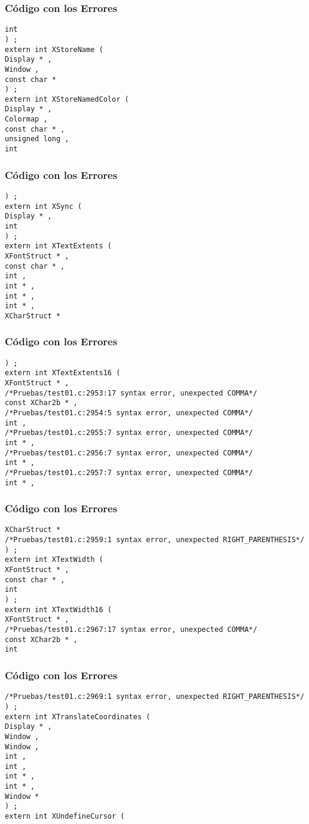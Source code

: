 \documentclass{beamer}
\begin{document}
\begin{frame}[fragile]
\frametitle{C\'odigo con los Errores}
\begin{verbatim}
int 
) ; 
extern int XStoreName ( 
Display * , 
Window , 
const char * 
) ; 
extern int XStoreNamedColor ( 
Display * , 
Colormap , 
const char * , 
unsigned long , 
int 
\end{verbatim}
\end{frame}
\begin{frame}[fragile]
\frametitle{C\'odigo con los Errores}
\begin{verbatim}
) ; 
extern int XSync ( 
Display * , 
int 
) ; 
extern int XTextExtents ( 
XFontStruct * , 
const char * , 
int , 
int * , 
int * , 
int * , 
XCharStruct * 
\end{verbatim}
\end{frame}
\begin{frame}[fragile]
\frametitle{C\'odigo con los Errores}
\begin{verbatim}
) ; 
extern int XTextExtents16 ( 
XFontStruct * , 
/*Pruebas/test01.c:2953:17 syntax error, unexpected COMMA*/
const XChar2b * , 
/*Pruebas/test01.c:2954:5 syntax error, unexpected COMMA*/
int , 
/*Pruebas/test01.c:2955:7 syntax error, unexpected COMMA*/
int * , 
/*Pruebas/test01.c:2956:7 syntax error, unexpected COMMA*/
int * , 
/*Pruebas/test01.c:2957:7 syntax error, unexpected COMMA*/
int * , 
\end{verbatim}
\end{frame}
\begin{frame}[fragile]
\frametitle{C\'odigo con los Errores}
\begin{verbatim}
XCharStruct * 
/*Pruebas/test01.c:2959:1 syntax error, unexpected RIGHT_PARENTHESIS*/
) ; 
extern int XTextWidth ( 
XFontStruct * , 
const char * , 
int 
) ; 
extern int XTextWidth16 ( 
XFontStruct * , 
/*Pruebas/test01.c:2967:17 syntax error, unexpected COMMA*/
const XChar2b * , 
int 
\end{verbatim}
\end{frame}
\begin{frame}[fragile]
\frametitle{C\'odigo con los Errores}
\begin{verbatim}
/*Pruebas/test01.c:2969:1 syntax error, unexpected RIGHT_PARENTHESIS*/
) ; 
extern int XTranslateCoordinates ( 
Display * , 
Window , 
Window , 
int , 
int , 
int * , 
int * , 
Window * 
) ; 
extern int XUndefineCursor ( 
\end{verbatim}
\end{frame}
\end{document}
